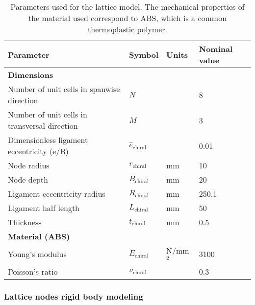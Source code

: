     \begin{table}[!htpb]
    \centering
    \begin{tabular}{|l|lll|}
    \hline
    \textbf{Parameter} & \multicolumn{1}{l|}{\textbf{Symbol}} & \multicolumn{1}{l|}{\textbf{Units}} & \textbf{Nominal value} \\ \hline \hline
    {\textbf{Dimensions}} &  &  &  \\ \hline
    Number of unit cells in spanwise direction & \multicolumn{1}{l|}{$N$} & \multicolumn{1}{l|}{} & 8 \\ \hline
    Number of unit cells in transversal direction & \multicolumn{1}{l|}{$M$} & \multicolumn{1}{l|}{} & 3 \\ \hline
    Dimensionless ligament eccentricity (e/B) & \multicolumn{1}{l|}{$\hat{e}_{\mathrm{chiral}}$} & \multicolumn{1}{l|}{} & 0.01 \\ \hline
    Node radius & \multicolumn{1}{l|}{$r_{\mathrm{chiral}}$} & \multicolumn{1}{l|}{mm} & 10 \\ \hline
    Node depth & \multicolumn{1}{l|}{$B_{\mathrm{chiral}}$} & \multicolumn{1}{l|}{mm} & 20 \\ \hline
    Ligament eccentricity radius & \multicolumn{1}{l|}{$R_{\mathrm{chiral}}$} & \multicolumn{1}{l|}{mm} & 250.1 \\ \hline
    Ligament half length & \multicolumn{1}{l|}{$L_{\mathrm{chiral}}$} & \multicolumn{1}{l|}{mm} & 50 \\ \hline
    Thickness & \multicolumn{1}{l|}{$t_{\mathrm{chiral}}$} & \multicolumn{1}{l|}{mm} & 0.5 \\ \hline \hline
    {\textbf{Material (ABS)}} &  &  &  \\ \hline
    Young's modulus & \multicolumn{1}{l|}{$E_{\mathrm{chiral}}$} & \multicolumn{1}{l|}{N/mm$^2$} & 3100 \\ \hline
    Poisson's ratio & \multicolumn{1}{l|}{$\nu_{\mathrm{chiral}}$} & \multicolumn{1}{l|}{} & 0.3 \\ \hline
    \end{tabular}
    \caption[Parameters used for the lattice model]{Parameters used for the lattice model. The mechanical properties of the material used correspond to ABS, which is a common thermoplastic polymer.}
    \label{tab:parameters_lattice}
    \end{table}

    \clearpage
    \subsubsection{Lattice nodes rigid body modeling} \label{subsubsec:latticeNodesRigid_Parametrization}

